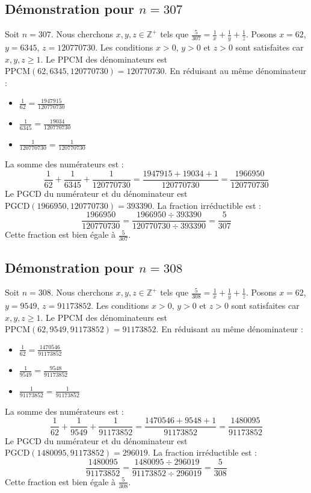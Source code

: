 \documentclass[11pt,a4paper]{article}
\begin{document}
\subsection{Démonstration pour $n = 307$}
Soit $n = 307$. Nous cherchons $x, y, z \in \mathbb{Z}^{+}$ tels que $\frac{5}{307} = \frac{1}{x} + \frac{1}{y} + \frac{1}{z}$.
Posons $x = 62$, $y = 6345$, $z = 120770730$.
Les conditions $x > 0$, $y > 0$ et $z > 0$ sont satisfaites car $x, y, z \geq 1$.
Le PPCM des dénominateurs est $\text{PPCM}(62, 6345, 120770730) = 120770730$.
En réduisant au même dénominateur :
\begin{itemize}
    \item $\frac{1}{62} = \frac{1947915}{120770730}$
    \item $\frac{1}{6345} = \frac{19034}{120770730}$
    \item $\frac{1}{120770730} = \frac{1}{120770730}$
\end{itemize}
La somme des numérateurs est :
$$ \frac{1}{62} + \frac{1}{6345} + \frac{1}{120770730} = \frac{1947915 + 19034 + 1}{120770730} = \frac{1966950}{120770730} $$
Le PGCD du numérateur et du dénominateur est $\text{PGCD}(1966950, 120770730) = 393390$.
La fraction irréductible est :
$$ \frac{1966950}{120770730} = \frac{1966950 \div 393390}{120770730 \div 393390} = \frac{5}{307} $$
Cette fraction est bien égale à $\frac{5}{307}$.

\subsection{Démonstration pour $n = 308$}
Soit $n = 308$. Nous cherchons $x, y, z \in \mathbb{Z}^{+}$ tels que $\frac{5}{308} = \frac{1}{x} + \frac{1}{y} + \frac{1}{z}$.
Posons $x = 62$, $y = 9549$, $z = 91173852$.
Les conditions $x > 0$, $y > 0$ et $z > 0$ sont satisfaites car $x, y, z \geq 1$.
Le PPCM des dénominateurs est $\text{PPCM}(62, 9549, 91173852) = 91173852$.
En réduisant au même dénominateur :
\begin{itemize}
    \item $\frac{1}{62} = \frac{1470546}{91173852}$
    \item $\frac{1}{9549} = \frac{9548}{91173852}$
    \item $\frac{1}{91173852} = \frac{1}{91173852}$
\end{itemize}
La somme des numérateurs est :
$$ \frac{1}{62} + \frac{1}{9549} + \frac{1}{91173852} = \frac{1470546 + 9548 + 1}{91173852} = \frac{1480095}{91173852} $$
Le PGCD du numérateur et du dénominateur est $\text{PGCD}(1480095, 91173852) = 296019$.
La fraction irréductible est :
$$ \frac{1480095}{91173852} = \frac{1480095 \div 296019}{91173852 \div 296019} = \frac{5}{308} $$
Cette fraction est bien égale à $\frac{5}{308}$.
\end{document}
